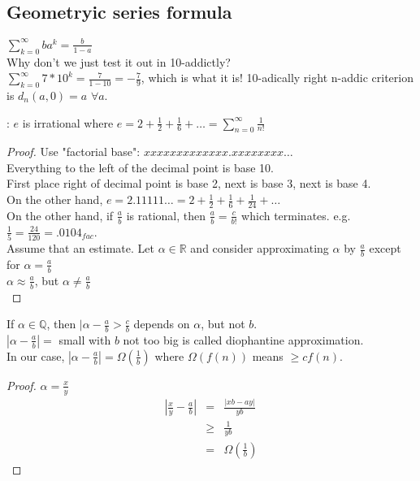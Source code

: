   \subsection*{Geometryic series formula}
    $\sum_{k = 0}^{\infty} ba^k = \frac{b}{1 - a}$\\
    Why don't we just test it out in 10-addictly?\\
    $\sum_{k = 0}^{\infty} 7*10^k = \frac{7}{1 - 10} = -\frac{7}{9}$, which
    is what it is! 10-adically right n-addic criterion is $d_n(a,0) = a$ 
    $\forall a$.\\
  \begin{theorem}: $e$ is irrational where $e = 2 + \frac{1}{2} + \frac{1}{6}
  + \ldots = \sum_{n = 0}^{\infty} \frac{1}{n!}$
  \end{theorem}
  \begin{proof}
    Use "factorial base":
    $xxxxxxxxxxxxx.xxxxxxxx\ldots$\\
    Everything to the left of the decimal point is base 10.\\
    First place right of decimal point is base 2, next is base 3, next is
    base 4.\\
    On the other hand, $e = 2.11111\ldots = 2 + \frac{1}{2} + \frac{1}{6} + 
    \frac{1}{24} + \ldots$\\
    On the other hand, if $\frac{a}{b}$ is rational, then $\frac{a}{b} = 
      \frac{c}{b!}$ which terminates. e.g. $\frac{1}{5} = \frac{24}{120} = 
      .0104_{fac}$.\\
    Assume that an estimate. Let $\alpha \in \mathbb{R}$ and consider 
    approximating $\alpha$ by $\frac{a}{b}$ except for $\alpha = \frac{a}{b}$\\
    $\alpha \approx \frac{a}{b}$, but $\alpha \not=\frac{a}{b}$\\
  \end{proof}
  \begin{theorem}
    If $\alpha \in \mathbb{Q}$, then $|\alpha - \frac{a}{b} > \frac{c}{b}$
    depends on $\alpha$, but not $b$.\\
    $|\alpha - \frac{a}{b}| = $ small with $b$ not too big is called diophantine
    approximation.\\
    In our case, $| \alpha - \frac{a}{b}| = \Omega(\frac{1}{b})$ where
    $\Omega(f(n))$ means $\ge cf(n)$.
  \end{theorem}
  \begin{proof}
    $\alpha = \frac{x}{y}$
    \begin{eqnarray*}
      |\frac{x}{y} - \frac{a}{b}| & = & \frac{|xb - ay|}{yb}\\
      &\ge& \frac{1}{yb}\\
      & = & \Omega(\frac{1}{b})
    \end{eqnarray*}
  \end{proof}
